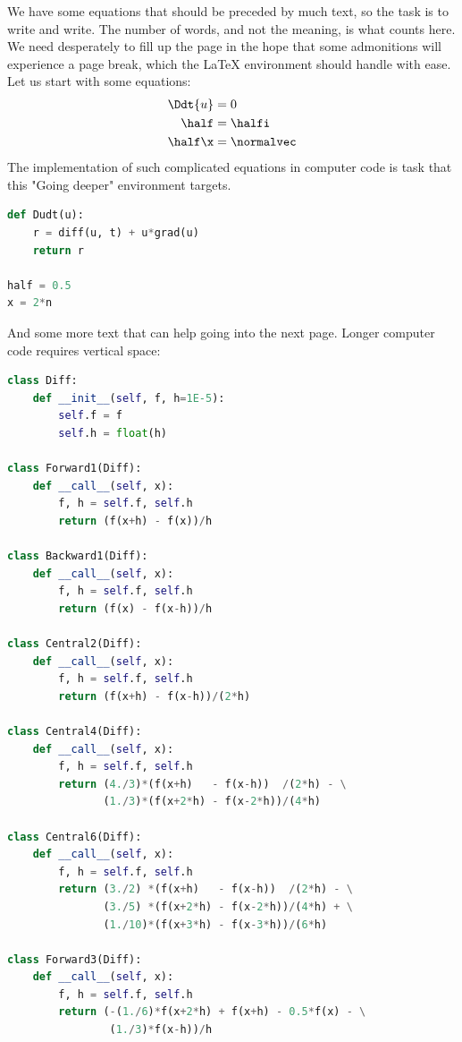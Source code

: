 \documentclass[%
oneside,                 %
final,                   %
10pt]{article}
\newenvironment{noticeshaded}
{\def\FrameCommand{\fboxsep=3mm\colorbox{colors1_notice_background}}
 \MakeFramed {\advance\hsize-\width \FrameRestore}}{\endMakeFramed}
\newenvironment{notice_colors1admon}[1][Notice]{
\begin{noticeshaded}
\noindent
\texttt{[image: latex\_figs/notice]}\ \ \   \textbf{#1}\\ \par
\vspace{-3mm}\nobreak\noindent\ignorespaces
}
{
\end{noticeshaded}
}
\begin{document}
\begin{notice_colors1admon}
We have some equations that should be preceded by much text, so the
task is to write and write. The number of words, and not the
meaning, is what counts here. We need desperately to fill up the
page in the hope that some admonitions will experience a page break,
which the {\LaTeX} environment should handle with ease.
Let us start with some equations:
\begin{align*}
\Ddt{u} &= 0
\\
\half &= \halfi\\
\half\x &= \normalvec
\end{align*}
The implementation of such complicated equations in computer
code is task that this "Going deeper" environment targets.
\begin{lstlisting}[language=Python,style=simple,xleftmargin=2mm]
def Dudt(u):
    r = diff(u, t) + u*grad(u)
    return r

half = 0.5
x = 2*n

\end{lstlisting}

And some more text that can help going into the next page.
Longer computer code requires vertical space:
\begin{lstlisting}[language=Python,style=simple,xleftmargin=2mm]
class Diff:
    def __init__(self, f, h=1E-5):
        self.f = f
        self.h = float(h)

class Forward1(Diff):
    def __call__(self, x):
        f, h = self.f, self.h
        return (f(x+h) - f(x))/h

class Backward1(Diff):
    def __call__(self, x):
        f, h = self.f, self.h
        return (f(x) - f(x-h))/h

class Central2(Diff):
    def __call__(self, x):
        f, h = self.f, self.h
        return (f(x+h) - f(x-h))/(2*h)

class Central4(Diff):
    def __call__(self, x):
        f, h = self.f, self.h
        return (4./3)*(f(x+h)   - f(x-h))  /(2*h) - \
               (1./3)*(f(x+2*h) - f(x-2*h))/(4*h)

class Central6(Diff):
    def __call__(self, x):
        f, h = self.f, self.h
        return (3./2) *(f(x+h)   - f(x-h))  /(2*h) - \
               (3./5) *(f(x+2*h) - f(x-2*h))/(4*h) + \
               (1./10)*(f(x+3*h) - f(x-3*h))/(6*h)

class Forward3(Diff):
    def __call__(self, x):
        f, h = self.f, self.h
        return (-(1./6)*f(x+2*h) + f(x+h) - 0.5*f(x) - \
                (1./3)*f(x-h))/h


\end{lstlisting}
\end{notice_colors1admon}
\end{document}
